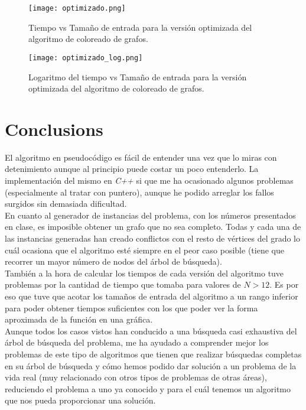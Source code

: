 \documentclass[british,a4paper,11pt,titlepage]{article}
\begin{document}
    \begin{figure}[p]
        \centering
        \texttt{[image: optimizado.png]}%
        \hspace{0.1\linewidth}%
        \caption[]{Tiempo vs Tamaño de entrada para la versión optimizada del algoritmo de coloreado de grafos.}
        \label{fig:res_optimizado}
    \end{figure}

    \begin{figure}[p]
        \centering
        \texttt{[image: optimizado\_log.png]}%
        \hspace{0.1\linewidth}%
        \caption[]{Logaritmo del tiempo vs Tamaño de entrada para la versión optimizada del algoritmo de coloreado de grafos.}
        \label{fig:res_optimizado_log}
    \end{figure}

    \clearpage


    \section{Conclusions}
    \label{sec:conclusions}
    El algoritmo en pseudocódigo es fácil de entender una vez que lo miras con detenimiento aunque al principio puede costar un poco entenderlo. La implementación del mismo en \emph{C++} si que me ha ocasionado algunos problemas (especialmente al tratar con puntero), aunque he podido arreglar los fallos surgidos sin demasiada dificultad.
    \\
    En cuanto al generador de instancias del problema, con los números presentados en clase, es imposible obtener un grafo que no sea completo. Todas y cada una de las instancias generadas han creado conflictos con el resto de vértices del grado lo cuál ocasiona que el algoritmo esté siempre en el peor caso posible (tiene que recorrer un mayor número de nodos del árbol de búsqueda).
    \\
    También a la hora de calcular los tiempos de cada versión del algoritmo tuve problemas por la cantidad de tiempo que tomaba para valores de $N>12$. Es por eso que tuve que acotar los tamaños de entrada del algoritmo a un rango inferior para poder obtener tiempos suficientes con los que poder ver la forma aproximada de la función en una gráfica.
    \\
    Aunque todos los casos vistos han conducido a una búsqueda casi exhaustiva del árbol de búsqueda del problema, me ha ayudado a comprender mejor los problemas de este tipo de algoritmos que tienen que realizar búsquedas completas en su árbol de búsqueda y cómo hemos podido dar solución a un problema de la vida real (muy relacionado con otros tipos de problemas de otras áreas), reduciendo el problema a uno ya conocido y para el cuál tenemos un algoritmo que nos pueda proporcionar una solución.
\end{document}

